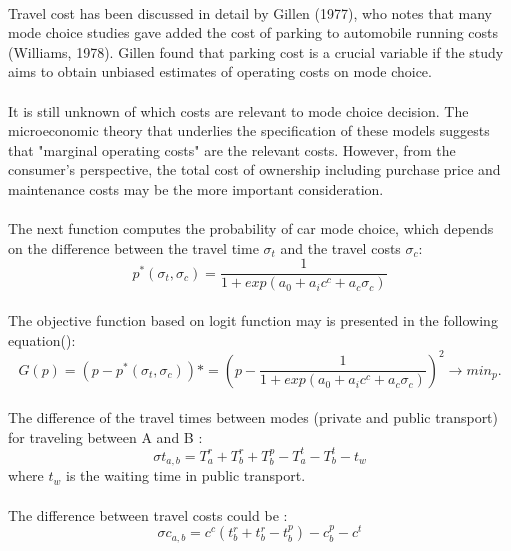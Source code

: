 \paragraph{}Travel cost has been discussed in detail by Gillen (1977), who notes that many mode choice studies gave added the cost of parking to automobile running costs (Williams, 1978). Gillen found that parking cost is a  crucial variable if the study aims to obtain unbiased estimates of operating costs on mode choice. 
\paragraph{}It is still unknown of which costs are relevant to mode choice decision. The microeconomic theory that underlies the specification of these models suggests that "marginal operating costs" are the relevant costs. However, from the consumer's perspective, the total cost of ownership including purchase price and maintenance costs may be the more important consideration.  
\paragraph{}The next function computes the probability of car mode choice, which depends on the difference between the travel time $\sigma_t$ and the travel costs $\sigma_c$:
\begin{equation}
p^{*}(\sigma_t,\sigma_c) = \frac{1}{1+exp(a_0+ a_i c^c + a_c \sigma_c)}
\end{equation}
\paragraph{}The objective function based on logit function may is presented in the following equation(\cite{Hollander et al, 2006}):
\begin{equation}
G(p) = (p - p^{*}(\sigma_t,\sigma_c))*
	 = (p - \frac{1}{1+exp(a_0+ a_i c^c + a_c \sigma_c)})^2 \rightarrow min_p.
\end{equation}
\paragraph{}The difference of the travel times between modes (private
and public transport) for traveling between A and B :
\begin{equation}
\sigma t_{a,b} = T^{r}_a + T^{r}_b + T^{p}_b - T^{t}_a - T^{t}_b - t_w
\end{equation}
where $t_w$ is the waiting time in public transport.
\paragraph{}The difference between travel costs could be : 
\begin{equation}
\sigma c_{a,b} = c^{c} ( t^{r}_b + t^{r}_b - t^{p}_b )- c^{p}_b - c^t
\end{equation}
